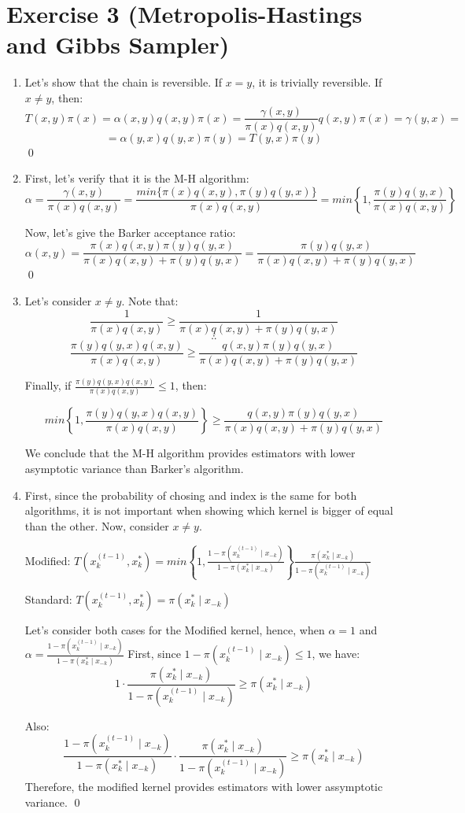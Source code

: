 \documentclass[12pt,letterpaper]{article}
\begin{document}
\section*{Exercise 3 (Metropolis-Hastings and Gibbs Sampler)}
\begin{enumerate}[leftmargin=!,labelindent=5pt]
\item  Let's show that the chain is reversible. If $x=y$, it is trivially
reversible. If $x \neq y$, then:
$$
T(x,y) \pi(x) = \alpha(x,y)q(x,y)\pi(x) =
\frac{\gamma(x,y)}{\pi(x)q(x,y)}q(x,y)\pi(x) = \gamma(y,x) =
$$
$$
= \alpha(y,x) q(y,x) \pi(y) = T(y,x) \pi(y)
$$
\qed

\item First, let's verify that it is the M-H algorithm:
$$
\alpha = \frac{\gamma(x,y)}{\pi(x)q(x,y)} = 
\frac{min \{  \pi(x) q(x,y), \pi(y) q(y,x) \}}
{\pi(x) q(x,y)} =
min \left \{
	1, \frac{\pi(y)q(y,x)}
	{\pi(x)q(x,y)}
\right\}
$$

Now, let's give the Barker acceptance ratio:
$$
\alpha(x,y) = \frac{\pi(x)q(x,y)\pi(y)q(y,x)}
{\pi(x)q(x,y)+\pi(y)q(y,x)} =
\frac{\pi(y)q(y,x)}{\pi(x)q(x,y) + \pi(y)q(y,x)}
$$
\qed

\item Let's consider $x \neq y$. Note that:
$$
\frac{1}{\pi(x)q(x,y)}
\geq
\frac{1}{\pi(x)q(x,y) + \pi(y)q(y,x)}
$$
$$
\therefore
$$
$$
\frac{\pi(y)q(y,x)q(x,y)}{\pi(x)q(x,y)}
\geq
\frac{q(x,y)\pi(y)q(y,x)}{\pi(x)q(x,y) + \pi(y)q(y,x)}
$$

Finally, if $\frac{\pi(y)q(y,x)q(x,y)}{\pi(x)q(x,y)} \leq 1$, then:

$$
min\left \{
1,
\frac{\pi(y)q(y,x)q(x,y)}{\pi(x)q(x,y)}
\right\}
\geq
\frac{q(x,y)\pi(y)q(y,x)}{\pi(x)q(x,y) + \pi(y)q(y,x)}
$$

We conclude that the M-H algorithm provides estimators with
lower asymptotic variance than Barker's algorithm.

\item First, since the probability of chosing and index is the same
for both algorithms, it is not important when showing which
kernel is bigger of equal than the other. Now, consider $x \neq y$.

Modified: $T(x_k^{(t-1)}, x_k^*) =
min\left\{
1, \frac{1- \pi(x_k^{(t-1)} \mid x_{-k})}{1 -  \pi(x_k^* \mid x_{-k})}
\right\}
\frac{\pi(x_k^* \mid x_{-k})}{1- \pi(x_k^{(t-1)} \mid x_{-k})}$

Standard: $T(x_k^{(t-1)}, x_k^*) = \pi(x_k^* \mid x_{-k})$

Let's consider both cases for the Modified kernel, hence, when
$\alpha = 1$ and
$\alpha =
\frac{1- \pi(x_k^{(t-1)} \mid x_{-k})}{1 -  \pi(x_k^* \mid x_{-k})} $
First, since $1- \pi(x_k^{(t-1)} \mid x_{-k})\leq 1$, we have:
$$
1 \cdot\frac{\pi(x_k^* \mid x_{-k})}{1- \pi(x_k^{(t-1)} \mid x_{-k})}
\geq
\pi(x_k^* \mid x_{-k})
$$

Also:
$$
\frac{1- \pi(x_k^{(t-1)} \mid x_{-k})}{1 -  \pi(x_k^* \mid x_{-k})}
\cdot\frac{\pi(x_k^* \mid x_{-k})}{1- \pi(x_k^{(t-1)} \mid x_{-k})}
\geq
\pi(x_k^* \mid x_{-k})
$$
Therefore, the modified kernel provides estimators
with lower assymptotic variance.
\qed
\end{enumerate}
\end{document}
